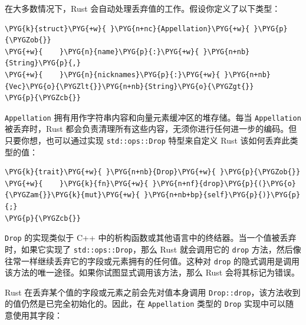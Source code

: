 在大多数情况下，Rust 会自动处理丢弃值的工作。假设你定义了以下类型：

\begin{Verbatim}[commandchars=\\\{\},breaklines=true,breakanywhere=true,fontsize=\codefont,xleftmargin=17bp]
\PYG{k}{struct}\PYG{+w}{ }\PYG{n+nc}{Appellation}\PYG{+w}{ }\PYG{p}{\PYGZob{}}
\PYG{+w}{    }\PYG{n}{name}\PYG{p}{:}\PYG{+w}{ }\PYG{n+nb}{String}\PYG{p}{,}
\PYG{+w}{    }\PYG{n}{nicknames}\PYG{p}{:}\PYG{+w}{ }\PYG{n+nb}{Vec}\PYG{o}{\PYGZlt{}}\PYG{n+nb}{String}\PYG{o}{\PYGZgt{}}
\PYG{p}{\PYGZcb{}}
\end{Verbatim}

\texttt{Appellation} 拥有用作字符串内容和向量元素缓冲区的堆存储。每当 \texttt{Appellation} 被丢弃时，Rust 都会负责清理所有这些内容，无须你进行任何进一步的编码。但只要你想，也可以通过实现 \texttt{std::ops::Drop} 特型来自定义 Rust 该如何丢弃此类型的值：

\begin{Verbatim}[commandchars=\\\{\},breaklines=true,breakanywhere=true,fontsize=\codefont,xleftmargin=17bp]
\PYG{k}{trait}\PYG{+w}{ }\PYG{n+nb}{Drop}\PYG{+w}{ }\PYG{p}{\PYGZob{}}
\PYG{+w}{    }\PYG{k}{fn}\PYG{+w}{ }\PYG{n+nf}{drop}\PYG{p}{(}\PYG{o}{\PYGZam{}}\PYG{k}{mut}\PYG{+w}{ }\PYG{n+nb+bp}{self}\PYG{p}{)}\PYG{p}{;}
\PYG{p}{\PYGZcb{}}
\end{Verbatim}

\texttt{Drop} 的实现类似于 C++ 中的析构函数或其他语言中的终结器。当一个值被丢弃时，如果它实现了 \texttt{std::ops::Drop}，那么 Rust 就会调用它的 \texttt{drop} 方法，然后像往常一样继续丢弃它的字段或元素拥有的任何值。这种对 \texttt{drop} 的隐式调用是调用该方法的唯一途径。如果你试图显式调用该方法，那么 Rust 会将其标记为错误。

Rust 在丢弃某个值的字段或元素之前会先对值本身调用 \texttt{Drop::drop}，该方法收到的值仍然是已完全初始化的。因此，在 \texttt{Appellation} 类型的 \texttt{Drop} 实现中可以随意使用其字段：

